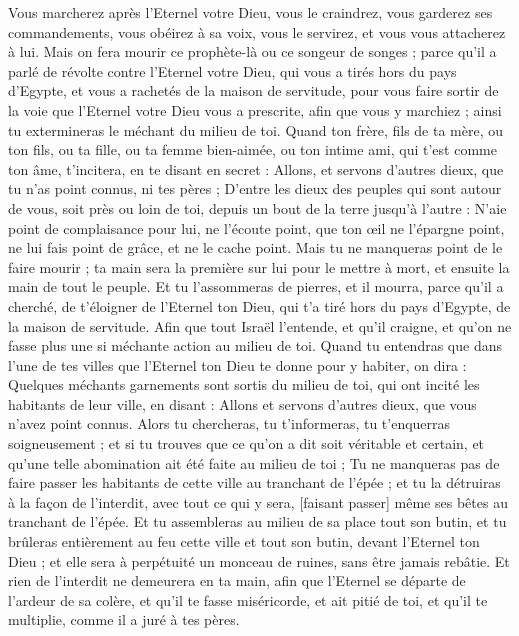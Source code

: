 \begin{multicols}{2}
Vous marcherez après l'Eternel votre Dieu, vous le craindrez, vous garderez ses commandements, vous obéirez à sa voix, vous le servirez, et vous vous attacherez à lui.
Mais on fera mourir ce prophète-là ou ce songeur de songes ; parce qu'il a parlé de révolte contre l'Eternel votre Dieu, qui vous a tirés hors du pays d'Egypte, et vous a rachetés de la maison de servitude, pour vous faire sortir de la voie que l'Eternel votre Dieu vous a prescrite, afin que vous y marchiez ; ainsi tu extermineras le méchant du milieu de toi.
Quand ton frère, fils de ta mère, ou ton fils, ou ta fille, ou ta femme bien-aimée, ou ton intime ami, qui t'est comme ton âme, t'incitera, en te disant en secret : Allons, et servons d'autres dieux, que tu n'as point connus, ni tes pères ;
D'entre les dieux des peuples qui sont autour de vous, soit près ou loin de toi, depuis un bout de la terre jusqu'à l'autre :
N'aie point de complaisance pour lui, ne l'écoute point, que ton œil ne l'épargne point, ne lui fais point de grâce, et ne le cache point.
Mais tu ne manqueras point de le faire mourir ; ta main sera la première sur lui pour le mettre à mort, et ensuite la main de tout le peuple.
Et tu l'assommeras de pierres, et il mourra, parce qu'il a cherché, de t'éloigner de l'Eternel ton Dieu, qui t'a tiré hors du pays d'Egypte, de la maison de servitude.
Afin que tout Israël l'entende, et qu'il craigne, et qu'on ne fasse plus une si méchante action au milieu de toi.
Quand tu entendras que dans l'une de tes villes que l'Eternel ton Dieu te donne pour y habiter, on dira :
Quelques méchants garnements sont sortis du milieu de toi, qui ont incité les habitants de leur ville, en disant : Allons et servons d'autres dieux, que vous n'avez point connus.
Alors tu chercheras, tu t'informeras, tu t'enquerras soigneusement ; et si tu trouves que ce qu'on a dit soit véritable et certain, et qu'une telle abomination ait été faite au milieu de toi ;
Tu ne manqueras pas de faire passer les habitants de cette ville au tranchant de l'épée ; et tu la détruiras à la façon de l'interdit, avec tout ce qui y sera, [faisant passer] même ses bêtes au tranchant de l'épée.
Et tu assembleras au milieu de sa place tout son butin, et tu brûleras entièrement au feu cette ville et tout son butin, devant l'Eternel ton Dieu ; et elle sera à perpétuité un monceau de ruines, sans être jamais rebâtie.
Et rien de l'interdit ne demeurera en ta main, afin que l'Eternel se départe de l'ardeur de sa colère, et qu'il te fasse miséricorde, et ait pitié de toi, et qu'il te multiplie, comme il a juré à tes pères.

\end{multicols}
